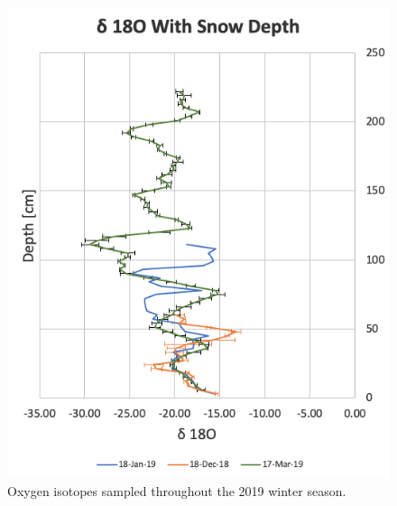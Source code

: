 \begin{figure}
    \centering
    \includegraphics[width=0.8\linewidth]{figures/Isotopes/Season_Isotopes.png}
    \caption{Oxygen isotopes sampled throughout the 2019 winter season.}
    \label{fig:WY2019_Isotopes}
 \end{figure}

